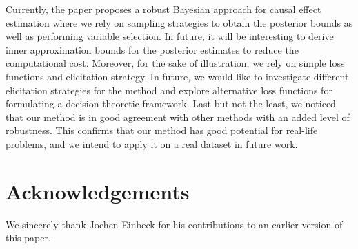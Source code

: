 \documentclass{amsart}
\begin{document}
Currently, the paper proposes a robust Bayesian approach for causal effect estimation where
we rely on sampling strategies to obtain the posterior bounds as well as performing 
variable selection. In future, it will be interesting to derive inner approximation bounds
for the posterior estimates to reduce the computational cost. Moreover, for the sake of
illustration, we rely on simple loss functions and elicitation strategy. In future, we would
like to investigate different elicitation strategies for the method and explore alternative 
loss functions for formulating a decision theoretic framework. Last but not the least,
we noticed that our method
is in good agreement with other methods with an added level of robustness.
This confirms that our method has good potential for real-life problems,
and we intend to apply it on a real dataset in future work.

\section*{Acknowledgements}

We sincerely thank Jochen Einbeck for his contributions to an earlier version of this paper.



\end{document}
